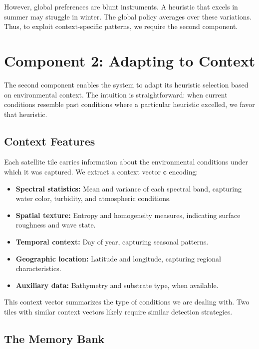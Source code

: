 \documentclass[11pt,a4paper]{article}
\begin{document}
However, global preferences are blunt instruments. A heuristic that excels in summer may struggle in winter. The global policy averages over these variations. Thus, to exploit context-specific patterns, we require the second component.


\section{Component 2: Adapting to Context}
\label{sec:component2}

The second component enables the system to adapt its heuristic selection based on environmental context. The intuition is straightforward: when current conditions resemble past conditions where a particular heuristic excelled, we favor that heuristic.

\subsection{Context Features}

Each satellite tile carries information about the environmental conditions under which it was captured. We extract a context vector $\mathbf{c}$ encoding:

\begin{itemize}[noitemsep]
    \item \textbf{Spectral statistics:} Mean and variance of each spectral band, capturing water color, turbidity, and atmospheric conditions.
    \item \textbf{Spatial texture:} Entropy and homogeneity measures, indicating surface roughness and wave state.
    \item \textbf{Temporal context:} Day of year, capturing seasonal patterns.
    \item \textbf{Geographic location:} Latitude and longitude, capturing regional characteristics.
    \item \textbf{Auxiliary data:} Bathymetry and substrate type, when available.
\end{itemize}

This context vector summarizes the type of conditions we are dealing with. Two tiles with similar context vectors likely require similar detection strategies.

\subsection{The Memory Bank}
\end{document}

